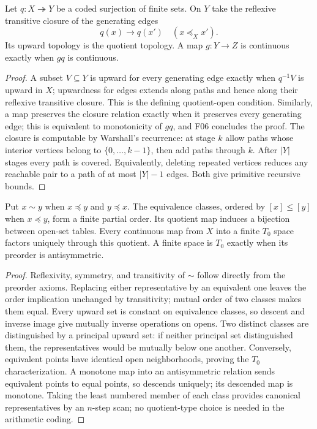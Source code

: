 \begin{theorem}\label{thm:finite-quotients}
Let $q:X\twoheadrightarrow Y$ be a coded surjection of finite sets.
On $Y$ take the reflexive transitive closure of the generating edges
\[
 q(x)\longrightarrow q(x')\quad(x\preceq_X x').
\]
Its upward topology is the quotient topology.  A map $g:Y\to Z$
is continuous exactly when $gq$ is continuous.
\end{theorem}
\begin{proof}
A subset $V\subseteq Y$ is upward for every generating edge
exactly when $q^{-1}V$ is upward in $X$; upwardness for edges
extends along paths and hence along their reflexive transitive
closure.  This is the defining quotient-open condition.  Similarly,
a map preserves the closure relation exactly when it preserves
every generating edge; this is equivalent to monotonicity of
$gq$, and F06 concludes the proof.  The closure is computable by
Warshall's recurrence: at stage $k$ allow paths whose interior
vertices belong to $\{0,\ldots,k-1\}$, then add paths through $k$.
After $|Y|$ stages every path is covered.  Equivalently, deleting
repeated vertices reduces any reachable pair to a path of at most
$|Y|-1$ edges.  Both give primitive recursive bounds.
\end{proof}

\begin{theorem}\label{thm:finite-tzero}
Put $x\sim y$ when $x\preceq y$ and $y\preceq x$.
The equivalence classes, ordered by $[x]\leq[y]$ when
$x\preceq y$, form a finite partial order.  Its quotient map
induces a bijection between open-set tables.  Every continuous map
from $X$ into a finite $T_0$ space factors uniquely through this
quotient.  A finite space is $T_0$ exactly when its preorder is
antisymmetric.
\end{theorem}
\begin{proof}
Reflexivity, symmetry, and transitivity of $\sim$ follow directly
from the preorder axioms.  Replacing either representative by an
equivalent one leaves the order implication unchanged by
transitivity; mutual order of two classes makes them equal.
Every upward set is constant on equivalence classes, so descent
and inverse image give mutually inverse operations on opens.
Two distinct classes are distinguished by a principal upward set:
if neither principal set distinguished them, the representatives
would be mutually below one another.  Conversely, equivalent
points have identical open neighborhoods, proving the $T_0$
characterization.  A monotone map into an antisymmetric relation
sends equivalent points to equal points, so descends uniquely;
its descended map is monotone.  Taking the least numbered member
of each class provides canonical representatives by an $n$-step
scan; no quotient-type choice is needed in the arithmetic coding.
\end{proof}

